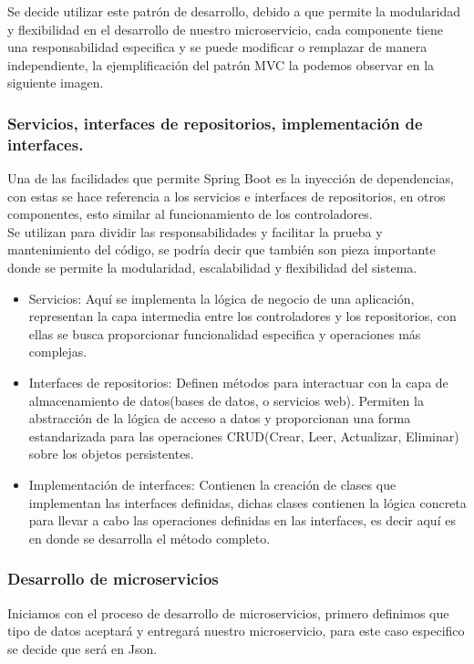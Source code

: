 	\hfill
	\begin{minipage}{0.7\textwidth}
		Se decide utilizar este patrón de desarrollo, debido a que permite la modularidad y flexibilidad en el desarrollo de nuestro microservicio, cada componente tiene una responsabilidad especifica y se puede modificar o remplazar de manera independiente, la ejemplificación del patrón MVC la podemos observar en la siguiente imagen.
	\end{minipage}
	
	\subsubsection{Servicios, interfaces de repositorios, implementación de interfaces.}
	Una de las facilidades que permite Spring Boot es la inyección de dependencias, con estas se hace referencia a los servicios e interfaces de repositorios, en otros componentes, esto similar al funcionamiento de los controladores.\\
	Se utilizan para dividir las responsabilidades y facilitar la prueba y mantenimiento del código, se podría decir que también son pieza importante donde se permite la modularidad, escalabilidad y flexibilidad del sistema.
	\begin{itemize}
		\item Servicios: Aquí se implementa la lógica de negocio de una aplicación, representan la capa intermedia entre los controladores y los repositorios, con ellas se busca proporcionar funcionalidad especifica y operaciones más complejas.
		\item Interfaces de repositorios: Definen métodos para interactuar con la capa de almacenamiento de datos(bases de datos, o servicios web). Permiten la abstracción de la lógica de acceso a datos y proporcionan una forma estandarizada para las operaciones CRUD(Crear, Leer, Actualizar, Eliminar) sobre los objetos persistentes. 
		\item Implementación de interfaces: Contienen la creación de clases que implementan las interfaces definidas, dichas clases contienen la lógica concreta para llevar a cabo las operaciones definidas en las interfaces, es decir aquí es en donde se desarrolla el método completo.
	\end{itemize}
	
	
	
	\subsubsection{Desarrollo de microservicios}
	Iniciamos con el proceso de desarrollo de microservicios, primero definimos que tipo de datos aceptará y entregará nuestro microservicio, para este caso especifico se decide que será en Json.\\
	
